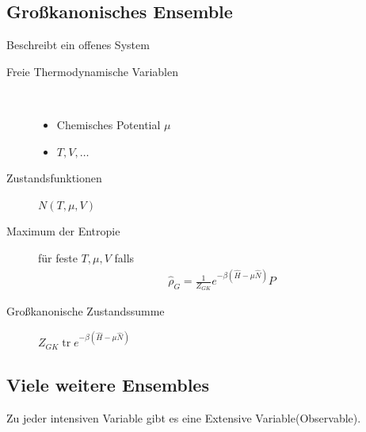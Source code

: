 \documentclass[11pt]{article}
\theoremstyle{plain}
\theoremstyle{mytheoremstyle}
\newcommand{\trace}{\operatorname{tr}}
\begin{document}
\subsection*{Gro\ss{}kanonisches Ensemble}
Beschreibt ein offenes System
\begin{description}
  \item[Freie Thermodynamische Variablen]  $ $
    \begin{itemize}
      \item Chemisches Potential $\mu$
      \item $T, V, \ldots$
    \end{itemize}
  \item[Zustandsfunktionen] $N(T, \mu, V)$
  \item[Maximum der Entropie] f\"ur feste $T, \mu, V$ falls
    \begin{align*}
      \hat{\rho}_G = \frac{1}{Z_{GK}} e^{-\beta(\hat{H}- \mu \hat{N})} P
    \end{align*}
  \item[Gro\ss{}kanonische Zustandssumme] $Z_{GK} 
    \trace e^{-\beta(\hat{H}- \mu \hat{N})} $
\end{description}
\subsection*{Viele weitere Ensembles}
Zu jeder intensiven Variable gibt es eine Extensive Variable(Observable).

\begin{center}
\end{center}
\end{document}
